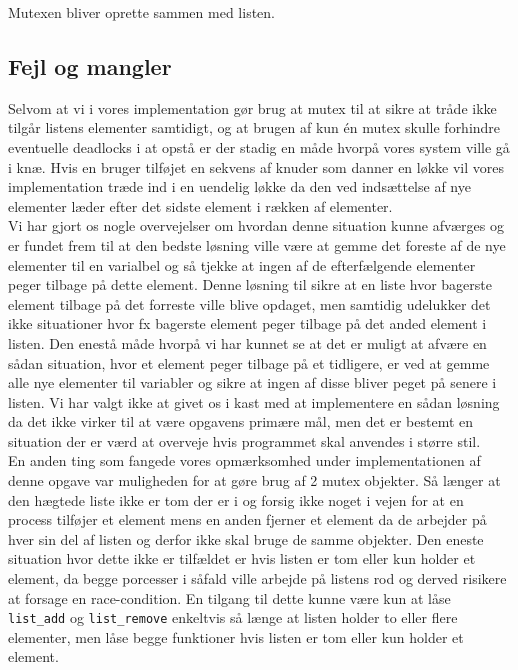 \documentclass[main.tex]{subfile}
\begin{document}
Mutexen bliver oprette sammen med listen.

\subsection{Fejl og mangler}
Selvom at vi i vores implementation gør brug at mutex til at sikre at tråde ikke tilgår listens elementer samtidigt, og at brugen af kun én mutex skulle forhindre eventuelle deadlocks i at opstå er der stadig en måde hvorpå vores system ville gå i knæ. Hvis en bruger tilføjet en sekvens af knuder som danner en løkke vil vores implementation træde ind i en uendelig løkke da den ved indsættelse af nye elementer læder efter det sidste element i rækken af elementer.\\

Vi har gjort os nogle overvejelser om hvordan denne situation kunne afværges og er fundet frem til at den bedste løsning ville være at gemme det foreste af de nye elementer til en varialbel og så tjekke at ingen af de efterfælgende elementer peger tilbage på dette element. Denne løsning til sikre at en liste hvor bagerste element tilbage på det forreste ville blive opdaget, men samtidig udelukker det ikke situationer hvor fx bagerste element peger tilbage på det anded element i listen. Den enestå måde hvorpå vi har kunnet se at det er muligt at afvære en sådan situation, hvor et element peger tilbage på et tidligere, er ved at gemme alle nye elementer til variabler og sikre at ingen af disse bliver peget på senere i listen. Vi har valgt ikke at givet os i kast med at implementere en sådan løsning da det ikke virker til at være opgavens primære mål, men det er bestemt en situation der er værd at overveje hvis programmet skal anvendes i større stil.\\

En anden ting som fangede vores opmærksomhed under implementationen af denne opgave var muligheden for at gøre brug af 2 mutex objekter. Så længer at den hægtede liste ikke er tom der er i og forsig ikke noget i vejen for at en process tilføjer et element mens en anden fjerner et element da de arbejder på hver sin del af listen og derfor ikke skal bruge de samme objekter. Den eneste situation hvor dette ikke er tilfældet er hvis listen er tom eller kun holder et element, da begge porcesser i såfald ville arbejde på listens rod og derved risikere at forsage en race-condition. En tilgang til dette kunne være kun at låse \texttt{list\_add} og \texttt{list\_remove} enkeltvis så længe at listen holder to eller flere elementer, men låse begge funktioner hvis listen er tom eller kun holder et element.
\end{document}
